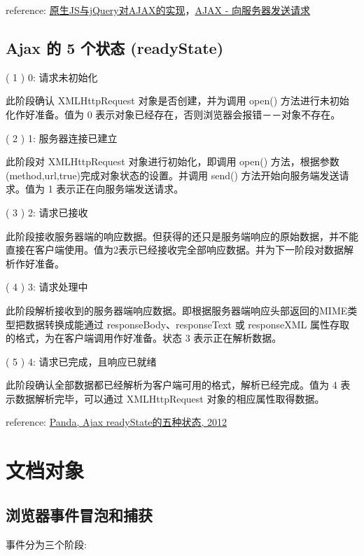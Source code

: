reference: \href{http://segmentfault.com/a/1190000003096293}{原生JS与jQuery对AJAX的实现}，\href{http://www.w3school.com.cn/ajax/ajax\_xmlhttprequest\_send.asp}{AJAX - 向服务器发送请求}

\subsection{Ajax 的 5 个状态 (readyState)}\hypertarget{ajax--5--readystate}{}\label{ajax--5--readystate}

( 1 ) 0: 请求未初始化

此阶段确认 XMLHttpRequest 对象是否创建，并为调用 open() 方法进行未初始化作好准备。值为 0 表示对象已经存在，否则浏览器会报错－－对象不存在。

( 2 ) 1: 服务器连接已建立

此阶段对 XMLHttpRequest 对象进行初始化，即调用 open() 方法，根据参数 (method,url,true)完成对象状态的设置。并调用 send() 方法开始向服务端发送请求。值为 1 表示正在向服务端发送请求。

( 3 ) 2: 请求已接收

此阶段接收服务器端的响应数据。但获得的还只是服务端响应的原始数据，并不能直接在客户端使用。值为2表示已经接收完全部响应数据。并为下一阶段对数据解析作好准备。

( 4 ) 3: 请求处理中

此阶段解析接收到的服务器端响应数据。即根据服务器端响应头部返回的MIME类型把数据转换成能通过 responseBody、responseText 或 responseXML 属性存取的格式，为在客户端调用作好准备。状态 3 表示正在解析数据。

( 5 ) 4: 请求已完成，且响应已就绪

此阶段确认全部数据都已经解析为客户端可用的格式，解析已经完成。值为 4 表示数据解析完毕，可以通过 XMLHttpRequest 对象的相应属性取得数据。

reference: \href{http://blog.163.com/freestyle\_le/blog/static/183279448201269112527311/}{Panda, Ajax readyState的五种状态, 2012}

\section{文档对象}\hypertarget{section-8}{}\label{section-8}

\subsection{浏览器事件冒泡和捕获}\hypertarget{section-9}{}\label{section-9}

事件分为三个阶段:

